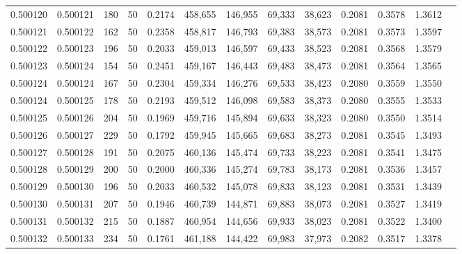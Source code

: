 \begin{tabular}{rrrrrrrrrrrrr}
0.500120 & 0.500121 & 180 &  50 &                                     0.2174 & 458,655 & 146,955 &  69,333 &  38,623 & 0.2081 & 0.3578 & 1.3612 \\
0.500121 & 0.500122 & 162 &  50 &                                     0.2358 & 458,817 & 146,793 &  69,383 &  38,573 & 0.2081 & 0.3573 & 1.3597 \\
0.500122 & 0.500123 & 196 &  50 &                                     0.2033 & 459,013 & 146,597 &  69,433 &  38,523 & 0.2081 & 0.3568 & 1.3579 \\
0.500123 & 0.500124 & 154 &  50 &                                     0.2451 & 459,167 & 146,443 &  69,483 &  38,473 & 0.2081 & 0.3564 & 1.3565 \\
0.500124 & 0.500124 & 167 &  50 &                                     0.2304 & 459,334 & 146,276 &  69,533 &  38,423 & 0.2080 & 0.3559 & 1.3550 \\
0.500124 & 0.500125 & 178 &  50 &                                     0.2193 & 459,512 & 146,098 &  69,583 &  38,373 & 0.2080 & 0.3555 & 1.3533 \\
0.500125 & 0.500126 & 204 &  50 &                                     0.1969 & 459,716 & 145,894 &  69,633 &  38,323 & 0.2080 & 0.3550 & 1.3514 \\
0.500126 & 0.500127 & 229 &  50 &                                     0.1792 & 459,945 & 145,665 &  69,683 &  38,273 & 0.2081 & 0.3545 & 1.3493 \\
0.500127 & 0.500128 & 191 &  50 &                                     0.2075 & 460,136 & 145,474 &  69,733 &  38,223 & 0.2081 & 0.3541 & 1.3475 \\
0.500128 & 0.500129 & 200 &  50 &                                     0.2000 & 460,336 & 145,274 &  69,783 &  38,173 & 0.2081 & 0.3536 & 1.3457 \\
0.500129 & 0.500130 & 196 &  50 &                                     0.2033 & 460,532 & 145,078 &  69,833 &  38,123 & 0.2081 & 0.3531 & 1.3439 \\
0.500130 & 0.500131 & 207 &  50 &                                     0.1946 & 460,739 & 144,871 &  69,883 &  38,073 & 0.2081 & 0.3527 & 1.3419 \\
0.500131 & 0.500132 & 215 &  50 &                                     0.1887 & 460,954 & 144,656 &  69,933 &  38,023 & 0.2081 & 0.3522 & 1.3400 \\
0.500132 & 0.500133 & 234 &  50 &                                     0.1761 & 461,188 & 144,422 &  69,983 &  37,973 & 0.2082 & 0.3517 & 1.3378 \\

\end{tabular}
